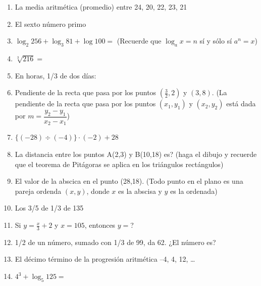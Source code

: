 \documentclass[11pt,twoside,letter]{article}
\begin{document}
\begin{enumerate}
 \item La media aritmética (promedio) entre 24, 20, 22, 23, 21
 \item El sexto número primo
 \item $\log_{2}256+\log_{3}81+\log100=$ (Recuerde que $\log_{a}x=n$ s\'{i} y s\'{o}lo s\'{i} $a^{n}=x$)
 \item $\sqrt[3]{216}=$
 \item En horas, 1/3 de dos días:
 \item Pendiente de la recta que pasa por los puntos $\left(\frac{3}{2},2\right)$ y $(3,8)$. (La pendiente de la recta que pasa por los puntos $(x_{1},y_{1})$ y $(x_{2},y_{2})$ está dada por $m=\dfrac{y_{2}-y_{1}}{x_{2}-x_{1}}$)
 \item $\{(-28)\div(-4)\}\cdot(-2)+28$
 \item La distancia entre los puntos A(2,3) y B(10,18) es? (haga el dibujo y recuerde que el teorema de Pitágoras se aplica en los triángulos rectángulos)
 \item El valor de la abscica en el punto (28,18). (Todo punto en el plano es una pareja ordenda $(x,y)$, donde $x$ es la abscisa y $y$ es la ordenada)
 \item Los 3/5 de 1/3 de 135
 \item Si $y=\frac{x}{3}+2$ y $x=105$, entonces $y=$?
 \item 1/2 de un número, sumado con 1/3 de 99, da 62. ¿El número es?
 \item El décimo término de la progresión aritmética --4, 4, 12, \ldots
 \item $4^{3}+\log_{5}125=$
\end{enumerate}
\end{document}
